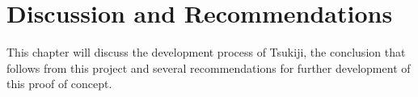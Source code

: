 \section{Discussion and Recommendations}
This chapter will discuss the development process of Tsukiji, the conclusion that follows from this project and several recommendations for further development of this proof of concept.


\newpage

\newpage

